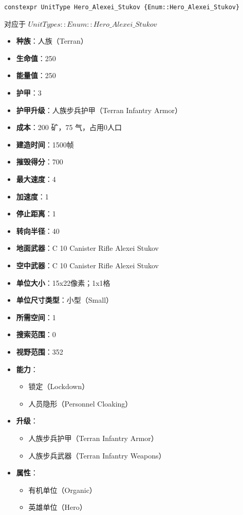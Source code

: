 \begin{tcolorbox}[colback=white, colframe=black!60!white, title=Hero\_Alexei\_Stukov(), arc=0mm]
    \begin{verbatim}
constexpr UnitType Hero_Alexei_Stukov {Enum::Hero_Alexei_Stukov}
    \end{verbatim}
    对应于  $ UnitTypes::Enum::Hero\_Alexei\_Stukov $ 
    \begin{itemize}
        \item \textbf{种族}：人族（Terran）
        \item \textbf{生命值}：250
        \item \textbf{能量值}：250
        \item \textbf{护甲}：3
        \item \textbf{护甲升级}：人族步兵护甲（Terran Infantry Armor）
        \item \textbf{成本}：200 矿，75 气，占用0人口
        \item \textbf{建造时间}：1500帧
        \item \textbf{摧毁得分}：700
        \item \textbf{最大速度}：4
        \item \textbf{加速度}：1
        \item \textbf{停止距离}：1
        \item \textbf{转向半径}：40
        \item \textbf{地面武器}：C 10 Canister Rifle Alexei Stukov
        \item \textbf{空中武器}：C 10 Canister Rifle Alexei Stukov
        \item \textbf{单位大小}：15x22像素；1x1格
        \item \textbf{单位尺寸类型}：小型（Small）
        \item \textbf{所需空间}：1
        \item \textbf{搜索范围}：0
        \item \textbf{视野范围}：352
        \item \textbf{能力}：
            \begin{itemize}
                \item 锁定（Lockdown）
                \item 人员隐形（Personnel Cloaking）
            \end{itemize}
        \item \textbf{升级}：
            \begin{itemize}
                \item 人族步兵护甲（Terran Infantry Armor）
                \item 人族步兵武器（Terran Infantry Weapons）
            \end{itemize}
        \item \textbf{属性}：
            \begin{itemize}
                \item 有机单位（Organic）
                \item 英雄单位（Hero）
            \end{itemize}
    \end{itemize}
\end{tcolorbox}

